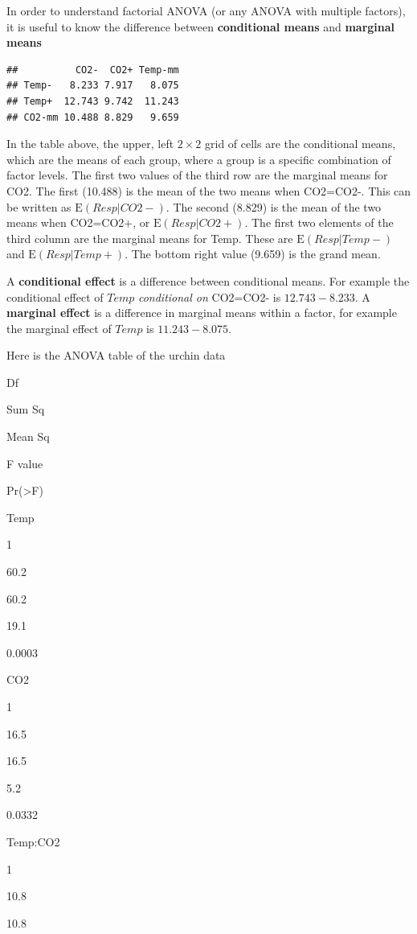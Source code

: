 \documentclass[]{book}
\begin{document}
In order to understand factorial ANOVA (or any ANOVA with multiple
factors), it is useful to know the difference between
\textbf{conditional means} and \textbf{marginal means}

\begin{verbatim}
##          CO2-  CO2+ Temp-mm
## Temp-   8.233 7.917   8.075
## Temp+  12.743 9.742  11.243
## CO2-mm 10.488 8.829   9.659
\end{verbatim}

In the table above, the upper, left \(2 \times 2\) grid of cells are the
conditional means, which are the means of each group, where a group is a
specific combination of factor levels. The first two values of the third
row are the marginal means for CO2. The first (10.488) is the mean of
the two means when CO2=CO2-. This can be written as
\(\mathrm{E}(Resp|CO2-)\). The second (8.829) is the mean of the two
means when CO2=CO2+, or \(\mathrm{E}(Resp|CO2+)\). The first two
elements of the third column are the marginal means for Temp. These are
\(\mathrm{E}(Resp|Temp-)\) and \(\mathrm{E}(Resp|Temp+)\). The bottom
right value (9.659) is the grand mean.

A \textbf{conditional effect} is a difference between conditional means.
For example the conditional effect of \(Temp\) \emph{conditional on}
CO2=CO2- is \(12.743-8.233\). A \textbf{marginal effect} is a difference
in marginal means within a factor, for example the marginal effect of
\(Temp\) is \(11.243 - 8.075\).

Here is the ANOVA table of the urchin data

Df

Sum Sq

Mean Sq

F value

Pr(\textgreater{}F)

Temp

1

60.2

60.2

19.1

0.0003

CO2

1

16.5

16.5

5.2

0.0332

Temp:CO2

1

10.8

10.8
\end{document}
